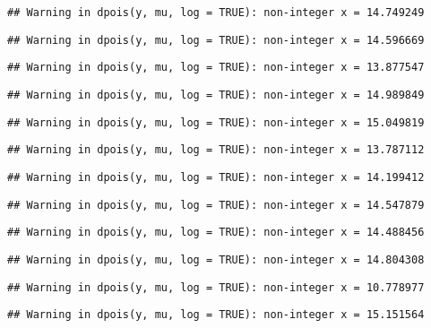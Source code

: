 \documentclass[
]{article}
\begin{document}
\begin{verbatim}
## Warning in dpois(y, mu, log = TRUE): non-integer x = 14.749249
\end{verbatim}

\begin{verbatim}
## Warning in dpois(y, mu, log = TRUE): non-integer x = 14.596669
\end{verbatim}

\begin{verbatim}
## Warning in dpois(y, mu, log = TRUE): non-integer x = 13.877547
\end{verbatim}

\begin{verbatim}
## Warning in dpois(y, mu, log = TRUE): non-integer x = 14.989849
\end{verbatim}

\begin{verbatim}
## Warning in dpois(y, mu, log = TRUE): non-integer x = 15.049819
\end{verbatim}

\begin{verbatim}
## Warning in dpois(y, mu, log = TRUE): non-integer x = 13.787112
\end{verbatim}

\begin{verbatim}
## Warning in dpois(y, mu, log = TRUE): non-integer x = 14.199412
\end{verbatim}

\begin{verbatim}
## Warning in dpois(y, mu, log = TRUE): non-integer x = 14.547879
\end{verbatim}

\begin{verbatim}
## Warning in dpois(y, mu, log = TRUE): non-integer x = 14.488456
\end{verbatim}

\begin{verbatim}
## Warning in dpois(y, mu, log = TRUE): non-integer x = 14.804308
\end{verbatim}

\begin{verbatim}
## Warning in dpois(y, mu, log = TRUE): non-integer x = 10.778977
\end{verbatim}

\begin{verbatim}
## Warning in dpois(y, mu, log = TRUE): non-integer x = 15.151564
\end{verbatim}
\end{document}

